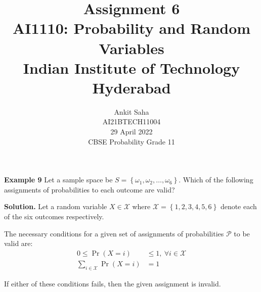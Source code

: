 \documentclass[journal,12pt,twocolumn]{IEEEtran}
\title{Assignment 6 \\ \Large AI1110: Probability and Random Variables \\ \large Indian Institute of Technology Hyderabad}
\author{Ankit Saha \\ \normalsize AI21BTECH11004 \\ \vspace*{20pt} \normalsize  29 April 2022 \\ \vspace*{20pt} \Large CBSE Probability Grade 11}
\providecommand{\pr}[1]{\ensuremath{\Pr\left(#1\right)}}
\providecommand{\cbrak}[1]{\ensuremath{\left\{#1\right\}}}
\begin{document}
	\maketitle
	
	\textbf{Example 9} 
	Let a sample space be $S = \cbrak{\omega_1, \omega_2, \ldots, \omega_6}$. Which of the following assignments of probabilities to each outcome are valid? 
	
	\textbf{Solution.}
	Let a random variable $X \in \mathcal{X}$ where $\mathcal{X} = \cbrak{1,2,3,4,5,6}$ denote each of the six outcomes respectively.
	
	The necessary conditions for a given set of assignments of probabilities $\mathcal{P}$ to be valid are:
	\begin{align}
	0 \le \pr{X=i} &\le 1, ~\forall i \in \mathcal{X} \label{cond1} \\
	\sum_{i \in \mathcal{X}} \pr{X=i} &= 1 \label{cond2}
	\end{align}
	
	If either of these conditions fails, then the given assignment is invalid.
	
\end{document}
